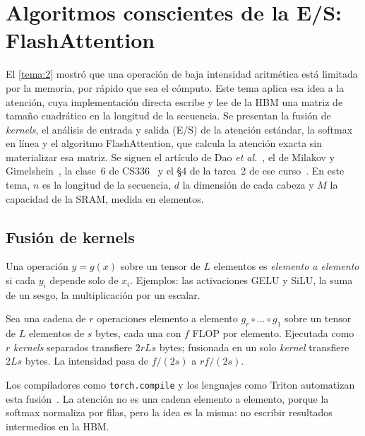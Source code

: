 \chapter{Algoritmos conscientes de la E/S: FlashAttention}
\label{tema:3}

El \cref{tema:2} mostró que una operación de baja intensidad aritmética está limitada por la memoria, por rápido que sea el cómputo. Este tema aplica esa idea a la atención, cuya implementación directa escribe y lee de la HBM una matriz de tamaño cuadrático en la longitud de la secuencia. Se presentan la fusión de \emph{kernels}, el análisis de entrada y salida (E/S) de la atención estándar, la softmax en línea y el algoritmo FlashAttention, que calcula la atención exacta sin materializar esa matriz. Se siguen el artículo de Dao \emph{et al.}~\cite[§2--3]{flash}, el de Milakov y Gimelshein~\cite{milakov}, la clase~6 de CS336~\cite{cs336} y el §4 de la tarea~2 de ese curso~\cite{cs336a2}. En este tema, $n$ es la longitud de la secuencia, $d$ la dimensión de cada cabeza y $M$ la capacidad de la SRAM, medida en elementos.

\section{Fusión de kernels}

\begin{definicion}
Una operación $y=g(x)$ sobre un tensor de $L$ elementos es \emph{elemento a elemento} si cada $y_i$ depende solo de $x_i$. Ejemplos: las activaciones GELU y SiLU, la suma de un sesgo, la multiplicación por un escalar.
\end{definicion}

\begin{proposicion}\label{prop:fusion}
Sea una cadena de $r$ operaciones elemento a elemento $g_r\circ\dots\circ g_1$ sobre un tensor de $L$ elementos de $s$ bytes, cada una con $f$ FLOP por elemento. Ejecutada como $r$ \emph{kernels} separados transfiere $2rLs$ bytes; fusionada en un solo \emph{kernel} transfiere $2Ls$ bytes. La intensidad pasa de $f/(2s)$ a $rf/(2s)$.
\end{proposicion}

Los compiladores como \texttt{torch.compile} y los lenguajes como Triton automatizan esta fusión~\cite{cs336}. La atención no es una cadena elemento a elemento, porque la softmax normaliza por filas, pero la idea es la misma: no escribir resultados intermedios en la HBM.

